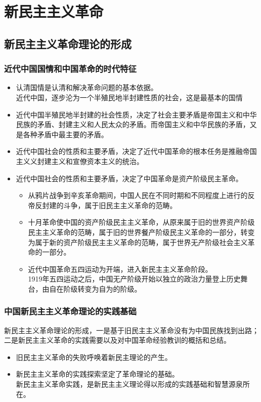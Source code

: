 \chapter{新民主主义革命}
\section{新民主主义革命理论的形成}
\subsection{近代中国国情和中国革命的时代特征}
\begin{itemize}
	\item 认清国情是认清和解决革命问题的基本依据。\\
	近代中国，逐步沦为一个半殖民地半封建性质的社会，这是最基本的国情
	\item 近代中国半殖民地半封建的社会性质，决定了社会主要矛盾是帝国主义和中华民族的矛盾、封建主义和人民太众的矛盾。而帝国主义和中华民族的矛盾，又是各种矛盾中最主要的矛盾。
	\item 近代中国社会的性质和主要矛盾，决定了近代中国革命的根本任务是推融帝国主义义封建主义和宣僚资本主义的统治。
	\item 近代中国社会的性质和主要矛盾，决定了中国革命是资产阶级民主革命。
	\begin{itemize}
		\item 	从鸦片战争到辛亥革命期间，中国人民在不同时期和不同程度上进行的反帝反封建的斗争，属于旧民主主义革命的范畴。
		\item 十月革命使中国的资产阶级民主主义革命，从原来属于旧的世界资产阶级民主主义革命的范畴，属于旧的世界餐产阶级民主义革命的一部分，转变为属于新的资产阶级民主主义革命的范畴，属于世界无产阶级社会主义革命的一部分。
		\item 近代中国革命五四运动为开端，进入新民主主义革命阶段。\\
		1919年五四运动之后，中国无产阶级开始以独立的政治力量登上历史舞台，由自在阶级转变为自为的阶级。
	\end{itemize}
\end{itemize}
\subsection{中国新民主主义革命理论的实践基础}
新民主主义革命理论的形成，一是基于旧民主主义革命没有为中国民族找到出路；二是新民主主义革命的实践需要以及对中国革命经验教训的概括和总结。
\begin{itemize}
	\item 旧民主主义革命的失败呼唤着新民主理论的产生。
	\item 新民主主义革命的实践探索坚定了革命理论的基础。\\
	新民主主义革命实践，是新民主主义理论得以形成的实践基础和智慧源泉所在。
\end{itemize}
